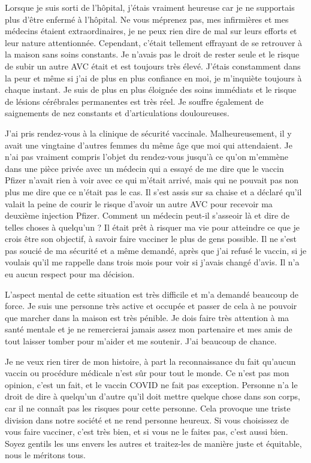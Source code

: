 Lorsque je suis sorti de l'hôpital, j'étais vraiment heureuse car je ne
supportais plus d'être enfermé à l'hôpital. Ne vous méprenez pas, mes
infirmières et mes médecins étaient extraordinaires, je ne peux rien dire de mal
sur leurs efforts et leur nature attentionnée. Cependant, c'était tellement
effrayant de se retrouver à la maison sans soins constants. Je n'avais pas le
droit de rester seule et le risque de subir un autre AVC était et est toujours
très élevé. J'étais constamment dans la peur et même si j'ai de plus en plus
confiance en moi, je m'inquiète toujours à chaque instant. Je suis de plus en
plus éloignée des soins immédiats et le risque de lésions cérébrales permanentes
est très réel. Je souffre également de saignements de nez constants et
d'articulations douloureuses.

J'ai pris rendez-vous à la clinique de sécurité vaccinale. Malheureusement, il y
avait une vingtaine d'autres femmes du même âge que moi qui attendaient. Je n'ai
pas vraiment compris l'objet du rendez-vous jusqu'à ce qu'on m'emmène dans une
pièce privée avec un médecin qui a essayé de me dire que le vaccin Pfizer
n'avait rien à voir avec ce qui m'était arrivé, mais qui ne pouvait pas non plus
me dire que ce n'était pas le cas. Il s'est assis sur sa chaise et a déclaré
qu'il valait la peine de courir le risque d'avoir un autre AVC pour recevoir ma
deuxième injection Pfizer. Comment un médecin peut-il s'asseoir là et dire de
telles choses à quelqu'un ? Il était prêt à risquer ma vie pour atteindre ce que
je crois être son objectif, à savoir faire vacciner le plus de gens possible. Il
ne s'est pas soucié de ma sécurité et a même demandé, après que j'ai refusé le
vaccin, si je voulais qu'il me rappelle dans trois mois pour voir si j'avais
changé d'avis. Il n'a eu aucun respect pour ma décision.

L'aspect mental de cette situation est très difficile et m'a demandé beaucoup de
force. Je suis une personne très active et occupée et passer de cela à ne
pouvoir que marcher dans la maison est très pénible. Je dois faire très
attention à ma santé mentale et je ne remercierai jamais assez mon partenaire et
mes amis de tout laisser tomber pour m'aider et me soutenir. J'ai beaucoup de
chance.

Je ne veux rien tirer de mon histoire, à part la reconnaissance du fait qu'aucun
vaccin ou procédure médicale n'est sûr pour tout le monde. Ce n'est pas mon
opinion, c'est un fait, et le vaccin COVID ne fait pas exception. Personne n'a
le droit de dire à quelqu'un d'autre qu'il doit mettre quelque chose dans son
corps, car il ne connaît pas les risques pour cette personne. Cela provoque une
triste division dans notre société et ne rend personne heureux. Si vous
choisissez de vous faire vacciner, c'est très bien, et si vous ne le faites pas,
c'est aussi bien. Soyez gentils les uns envers les autres et traitez-les de
manière juste et équitable, nous le méritons tous.


